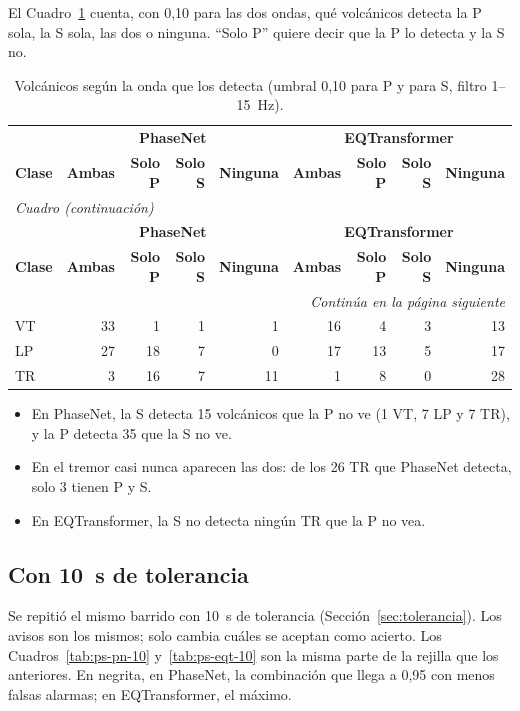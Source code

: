 \documentclass[11pt,a4paper,oneside,spanish,oldfontcommands]{memoir}
\newcommand{\cabecera}[2]{%
  \toprule #1 \\ \midrule \endfirsthead
  \multicolumn{#2}{l}{\itshape Cuadro \thetable{} (continuación)}\\
  \toprule #1 \\ \midrule \endhead
  \midrule \multicolumn{#2}{r}{\itshape Continúa en la página siguiente}\\ \endfoot
  \bottomrule \endlastfoot}
\begin{document}
El Cuadro~\ref{tab:solo-ps} cuenta, con 0,10 para las dos ondas, qué
volcánicos detecta la P sola, la S sola, las dos o ninguna. ``Solo P'' quiere
decir que la P lo detecta y la S no.

{\small
\setlength{\tabcolsep}{5pt}
\begin{longtable}{lrrrrrrrr}
\caption{Volcánicos según la onda que los detecta (umbral 0,10 para P y para S, filtro 1--15~Hz).}\label{tab:solo-ps}\\
\cabecera{ & \multicolumn{4}{c}{\textbf{PhaseNet}} & \multicolumn{4}{c}{\textbf{EQTransformer}} \\ \textbf{Clase} & \textbf{Ambas} & \textbf{Solo P} & \textbf{Solo S} & \textbf{Ninguna} & \textbf{Ambas} & \textbf{Solo P} & \textbf{Solo S} & \textbf{Ninguna}}{9}
VT & 33 & 1 & 1 & 1 & 16 & 4 & 3 & 13 \\
LP & 27 & 18 & 7 & 0 & 17 & 13 & 5 & 17 \\
TR & 3 & 16 & 7 & 11 & 1 & 8 & 0 & 28 \\
\end{longtable}
}

\begin{itemize}
\item En PhaseNet, la S detecta 15 volcánicos que la P no ve (1 VT, 7 LP y
  7 TR), y la P detecta 35 que la S no ve.
\item En el tremor casi nunca aparecen las dos: de los 26 TR que PhaseNet
  detecta, solo 3 tienen P y S.
\item En EQTransformer, la S no detecta ningún TR que la P no vea.
\end{itemize}

\subsection*{Con 10~s de tolerancia}

Se repitió el mismo barrido con 10~s de tolerancia (Sección~\ref{sec:tolerancia}).
Los avisos son los mismos; solo cambia cuáles se aceptan como acierto. Los
Cuadros~\ref{tab:ps-pn-10} y~\ref{tab:ps-eqt-10} son la misma parte de la
rejilla que los anteriores. En negrita, en PhaseNet, la combinación que llega a
0,95 con menos falsas alarmas; en EQTransformer, el máximo.
\end{document}
